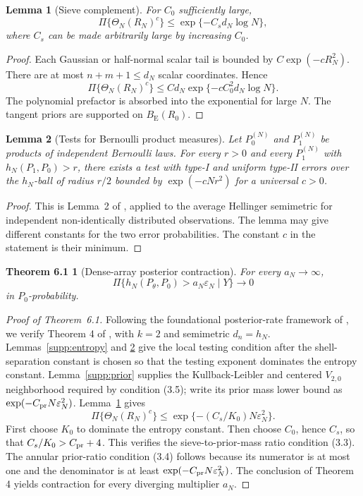 \documentclass[
  12pt]{article}
\newtheorem{lemma}{Lemma}[section]
\theoremstyle{definition}
\theoremstyle{plain}
\newtheorem*{mainthmcontraction}{Theorem 6.1}
\newcommand{\eps}{\varepsilon}
\begin{document}
\begin{lemma}[Sieve complement]
	\label{supp:sieve}
	For $C_0$ sufficiently large,
	\[
	\Pi\{\Theta_N(R_N)^c\}
	\le\exp\{-C_s d_N\log N\},
	\]
	where $C_s$ can be made arbitrarily large by increasing $C_0$.
\end{lemma}

\begin{proof}
	Each Gaussian or half-normal scalar tail is bounded by $C\exp(-cR_N^2)$. There are at most $n+m+1\le d_N$ scalar coordinates. Hence
	\[
	\Pi\{\Theta_N(R_N)^c\}
	\le Cd_N\exp\{-cC_0^2d_N\log N\}.
	\]
	The polynomial prefactor is absorbed into the exponential for large $N$. The tangent priors are supported on $B_{\mathrm E}(R_0)$.
\end{proof}

\begin{lemma}[Tests for Bernoulli product measures]
	\label{supp:tests}
	Let $P_0^{(N)}$ and $P_1^{(N)}$ be products of independent Bernoulli laws. For every $r>0$ and every $P_1^{(N)}$ with $h_N(P_1,P_0)>r$, there exists a test with type-I and uniform type-II errors over the $h_N$-ball of radius $r/2$ bounded by $\exp(-cNr^2)$ for a universal $c>0$.
\end{lemma}

\begin{proof}
	This is Lemma~2 of \citet{ghosal_2007_ConvergenceRatesPosterior}, applied to the average Hellinger semimetric for independent non-identically distributed observations. The lemma may give different constants for the two error probabilities. The constant $c$ in the statement is their minimum.
\end{proof}

\begin{mainthmcontraction}[Dense-array posterior contraction]
	For every $a_N\to\infty$,
	\[
	\Pi\{h_N(P_\theta,P_0)>a_N\eps_N\mid Y\}\to0
	\]
	in $P_0$-probability.
\end{mainthmcontraction}

\begin{proof}[Proof of Theorem~6.1]
	Following the foundational posterior-rate framework of \citet{ghosal_2000_ConvergenceRatesPosterior}, we verify Theorem 4 of \citet{ghosal_2007_ConvergenceRatesPosterior}, with $k=2$ and semimetric $d_n=h_N$. Lemmas~\ref{supp:entropy} and \ref{supp:tests} give the local testing condition after the shell-separation constant is chosen so that the testing exponent dominates the entropy constant. Lemma~\ref{supp:prior} supplies the Kullback-Leibler and centered $V_{2,0}$ neighborhood required by condition (3.5); write its prior mass lower bound as $\exp(-C_{\rm pr}N\eps_N^2)$. Lemma~\ref{supp:sieve} gives
	\[
	\Pi\{\Theta_N(R_N)^c\}
	\le \exp\{-(C_s/K_0)N\eps_N^2\}.
	\]
	First choose $K_0$ to dominate the entropy constant. Then choose $C_0$, hence $C_s$, so that $C_s/K_0>C_{\rm pr}+4$. This verifies the sieve-to-prior-mass ratio condition (3.3). The annular prior-ratio condition (3.4) follows because its numerator is at most one and the denominator is at least $\exp(-C_{\rm pr}N\eps_N^2)$. The conclusion of Theorem 4 yields contraction for every diverging multiplier $a_N$.
\end{proof}
\end{document}
